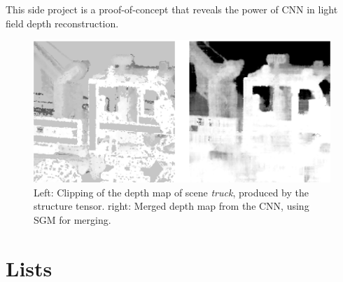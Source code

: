 \documentclass  [
  paper    = a4,
  BCOR     = 10mm,
  twoside,
  fontsize = 12pt,
  fleqn,
  toc      = bibnumbered,
  toc      = listofnumbered,
  numbers  = noendperiod,
  headings = normal,
  listof   = leveldown,
  version  = 3.03
]                                       {scrreprt}
\begin{document}
\begin{appendix}
This side project is a proof-of-concept that reveals the power of CNN in light field depth reconstruction.
\begin{figure}[h!]
	\centering
	\includegraphics[width=0.7\linewidth]{images/truck_cnndata}
	\caption[Truck with CNN +SGM]{Left: Clipping of the depth map of scene \textit{truck}, produced by the structure tensor. right: Merged depth map from the CNN, using SGM for merging. }
	\label{fig:depthcnntruck}
\end{figure}

\end{appendix}
\chapter{Lists}
\listoffigures
\listoftables
{}
{}


    
\end{document}
